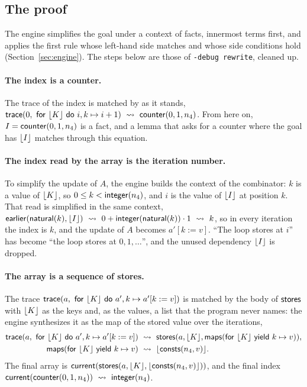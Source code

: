 \subsection{The proof}
The engine simplifies the goal under a context of facts, innermost terms first, and applies the first rule whose
left-hand side matches and whose side conditions hold (Section~\ref{sec:engine}). The steps below are those of
\texttt{-debug rewrite}, cleaned up.

\paragraph{The index is a counter.} The trace of the index is matched by  as it stands,
$\mathsf{trace}(0,\ \mathsf{for}\ \lfloor K\rfloor\ \mathsf{do}\ i, k \mapsto i + 1) \ \leadsto\  \mathsf{counter}(0, 1, n_4)$. From here on, $I = \mathsf{counter}(0, 1, n_4)$ is a fact, and a
lemma that asks for a counter where the goal has $\lfloor I\rfloor$ matches through this equation.

\paragraph{The index read by the array is the iteration number.} To simplify the update of $A$, the engine builds the
context of the combinator: $k$ is a value of $\lfloor K\rfloor$, so $0 \le k < \mathsf{integer}(n_4)$, and $i$ is the value of $\lfloor I\rfloor$ at
position $k$. That read is simplified in the same context,
$\mathsf{earlier}(\mathsf{natural}(k), \lfloor I\rfloor) \ \leadsto\  0 + \mathsf{integer}(\mathsf{natural}(k)) \cdot 1 \ \leadsto\  k$, so in every iteration the index is $k$, and the update
of $A$ becomes $a'[k := v]$. ``The loop stores at $i$'' has become ``the loop stores at $0, 1, \ldots$'', and the
unused dependency $\lfloor I\rfloor$ is dropped.

\paragraph{The array is a sequence of stores.} The trace $\mathsf{trace}(a,\ \mathsf{for}\ \lfloor K\rfloor\ \mathsf{do}\ a', k \mapsto a'[k := v])$ is matched by the
body of $\mathsf{stores}$ with $\lfloor K\rfloor$ as the keys and, as the values, a list that the program never names: the engine
synthesizes it as the map of the stored value over the iterations,
\begin{align*}
  \mathsf{trace}(a,\ \mathsf{for}\ \lfloor K\rfloor\ \mathsf{do}\ a', k \mapsto a'[k := v]) &\ \leadsto\  \mathsf{stores}(a, \lfloor K\rfloor, \mathsf{maps}(\mathsf{for}\ \lfloor K\rfloor\ \mathsf{yield}\ k \mapsto v)),\\
  \mathsf{maps}(\mathsf{for}\ \lfloor K\rfloor\ \mathsf{yield}\ k \mapsto v) &\ \leadsto\  \lfloor \mathsf{consts}(n_4, v)\rfloor.
\end{align*}
The final array is $\mathsf{current}(\mathsf{stores}(a, \lfloor K\rfloor, \lfloor \mathsf{consts}(n_4, v)\rfloor))$, and the final index
$\mathsf{current}(\mathsf{counter}(0, 1, n_4)) \ \leadsto\  \mathsf{integer}(n_4)$.

